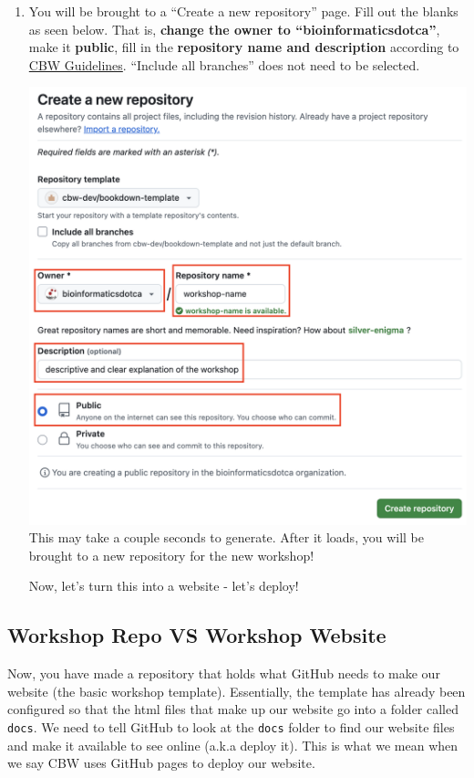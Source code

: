 \documentclass[
]{book}
\theoremstyle{definition}
\theoremstyle{definition}
\theoremstyle{definition}
\theoremstyle{definition}
\theoremstyle{remark}
\begin{document}
\begin{enumerate}
\def\labelenumi{\arabic{enumi}.}
\setcounter{enumi}{2}
\item
  You will be brought to a ``Create a new repository'' page. Fill out the blanks as seen below. That is, \textbf{change the owner to ``bioinformaticsdotca''}, make it \textbf{public}, fill in the \textbf{repository name and description} according to \href{}{CBW Guidelines}. ``Include all branches'' does not need to be selected.

  \includegraphics{img/template/make-new-repo.png}\\

  This may take a couple seconds to generate. After it loads, you will be brought to a new repository for the new workshop!

  Now, let's turn this into a website - let's deploy!
\end{enumerate}

\subsection{Workshop Repo VS Workshop Website}\label{workshop-vs-repo}

Now, you have made a repository that holds what GitHub needs to make our website (the basic workshop template). Essentially, the template has already been configured so that the html files that make up our website go into a folder called \texttt{docs}. We need to tell GitHub to look at the \texttt{docs} folder to find our website files and make it available to see online (a.k.a deploy it). This is what we mean when we say CBW uses GitHub pages to deploy our website.
\end{document}

